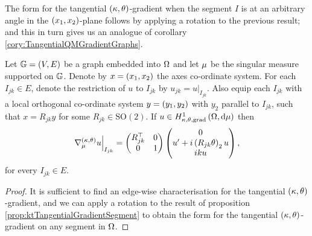 The form for the tangential $\left( \kappa, \theta \right)$-gradient when the segment $I$ is at an arbitrary angle in the $\left( x_1,x_2 \right)$-plane follows by applying a rotation to the previous result; and this in turn gives us an analogue of corollary \ref{cory:TangentialQMGradientGraphs}.
\begin{cory} \label{cory:ktTangentialGradientForm}
	Let $\mathbb{G}=\left( V,E \right)$ be a graph embedded into $\Omega$ and let $\mu$ be the singular measure supported on $\mathbb{G}$.
	Denote by $x=\left( x_1,x_2 \right)$ the axes co-ordinate system.
	For each $I_{jk}\in E$, denote the restriction of $u$ to $I_{jk}$ by $u_{jk} = u\vert_{I_{jk}}$.
	Also equip each $I_{jk}$ with a local orthogonal co-ordinate system $y=\left( y_1,y_2 \right)$ with $y_2$ parallel to $I_{jk}$, such that $x=R_{jk}y$ for some $R_{jk}\in\mathrm{SO}(2)$.
	If $u\in H^1_{\kappa,\theta,\mathrm{grad}}\left( \Omega, \mathrm{d}\mu \right)$ then
	\begin{align*}
		\left.\nabla^{\left( \kappa, \theta \right)}_{\mu}u\right\vert_{I_{jk}} = \begin{pmatrix} R_{jk}^\top & 0 \\ 0 & 1 \end{pmatrix} \begin{pmatrix} 0 \\ u' + i\left( R_{jk}\theta \right)_2 u \\ iku \end{pmatrix},
	\end{align*}
	for every $I_{jk}\in E$.
\end{cory}
\begin{proof}
	It is sufficient to find an edge-wise characterisation for the tangential $\left( \kappa, \theta \right)$-gradient, and we can apply a rotation to the result of proposition \ref{prop:ktTangentialGradientSegment} to obtain the form for the tangential $\left( \kappa, \theta \right)$-gradient on any segment in $\Omega$.
\end{proof}

